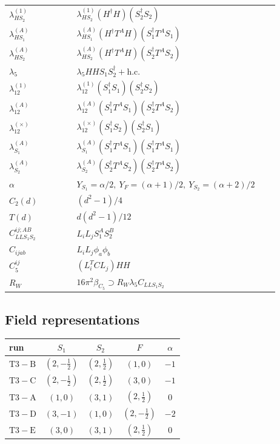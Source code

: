 \documentclass[9pt]{article}
\begin{document}
\begin{longtable}{@{}p{0.23\linewidth}p{0.69\linewidth}@{}}
$\lambda_{HS_2}^{(1)}$ & $\lambda_{HS_2}^{(1)}(H^\dagger H)(S_2^\dagger S_2)$ \\
$\lambda_{HS_1}^{(A)}$ & $\lambda_{HS_1}^{(A)}(H^\dagger T^AH)(S_1^\dagger T^AS_1)$ \\
$\lambda_{HS_2}^{(A)}$ & $\lambda_{HS_2}^{(A)}(H^\dagger T^AH)(S_2^\dagger T^AS_2)$ \\
$\lambda_5$ & $\lambda_5HHS_1S_2^\dagger+\mathrm{h.c.}$ \\
$\lambda_{12}^{(1)}$ & $\lambda_{12}^{(1)}(S_1^\dagger S_1)(S_2^\dagger S_2)$ \\
$\lambda_{12}^{(A)}$ & $\lambda_{12}^{(A)}(S_1^\dagger T^AS_1)(S_2^\dagger T^AS_2)$ \\
$\lambda_{12}^{(\times)}$ & $\lambda_{12}^{(\times)}(S_1^\dagger S_2)(S_2^\dagger S_1)$ \\
$\lambda_{S_1}^{(A)}$ & $\lambda_{S_1}^{(A)}(S_1^\dagger T^A S_1)(S_1^\dagger T^A S_1)$ \\
$\lambda_{S_2}^{(A)}$ & $\lambda_{S_2}^{(A)}(S_2^\dagger T^A S_2)(S_2^\dagger T^A S_2)$ \\
$\alpha$ & $Y_{S_1}=\alpha/2,\ Y_F=(\alpha+1)/2,\ Y_{S_2}=(\alpha+2)/2$ \\
$C_2(d)$ & $(d^2-1)/4$ \\
$T(d)$ & $d(d^2-1)/12$ \\
$C_{LLS_1S_2}^{ij;AB}$ & $L_iL_jS_1^AS_2^B$ \\
$C_{ijab}$ & $L_iL_j\phi_a\phi_b$ \\
$C_5^{ij}$ & $(L_i^TCL_j)HH$ \\
$R_W$ & $16\pi^2\beta_{C_5}\supset R_W\lambda_5C_{LLS_1S_2}$ \\
\bottomrule
\end{longtable}
\subsection*{Field representations}
\begin{longtable}{@{}lcccc@{}}
\toprule
run & $S_1$ & $S_2$ & $F$ & $\alpha$ \\
\midrule
$\mathrm{T3-B}$ & $(2,- \frac{1}{2})$ & $(2,\frac{1}{2})$ & $(1,0)$ & $-1$ \\
$\mathrm{T3-C}$ & $(2,- \frac{1}{2})$ & $(2,\frac{1}{2})$ & $(3,0)$ & $-1$ \\
$\mathrm{T3-A}$ & $(1,0)$ & $(3,1)$ & $(2,\frac{1}{2})$ & $0$ \\
$\mathrm{T3-D}$ & $(3,-1)$ & $(1,0)$ & $(2,- \frac{1}{2})$ & $-2$ \\
$\mathrm{T3-E}$ & $(3,0)$ & $(3,1)$ & $(2,\frac{1}{2})$ & $0$ \\
\bottomrule
\end{longtable}
\end{document}
